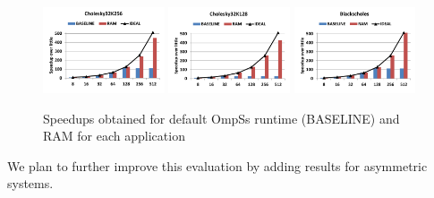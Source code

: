 \begin{figure}[!t]
  \includegraphics[width=0.32\textwidth]{Figs/cholesky_32K256.pdf}
  \includegraphics[width=0.32\textwidth]{Figs/cholesky_32K128.pdf}
  \includegraphics[width=0.32\textwidth]{Figs/blackscholes.pdf}
  \caption{Speedups obtained for default OmpSs runtime (BASELINE) and RAM for each application}
  \label{speedupRAM}
\end{figure}  

We plan to further improve this evaluation by adding results for asymmetric systems.
